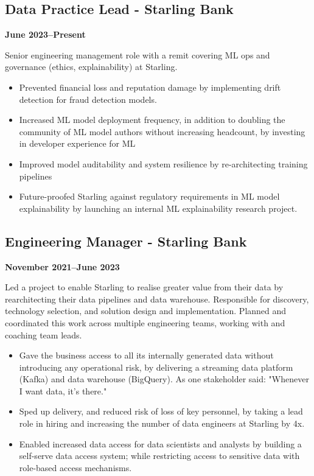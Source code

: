 \documentclass[a4paper]{scrartcl}
\begin{document}
\subsection*{Data Practice Lead - Starling Bank}
\textbf{June 2023--Present}

Senior engineering management role with a remit covering ML ops and governance (ethics,
explainability) at Starling.
\begin{itemize}
	\item Prevented financial loss and reputation damage by implementing
	      drift detection for fraud detection models.
	\item Increased ML model deployment frequency, in addition to doubling the community of ML model authors without increasing headcount, by investing in developer experience for ML
	\item Improved model auditability and system resilience by re-architecting training pipelines
	\item Future-proofed Starling against regulatory requirements in ML model explainability
	      by launching an internal ML explainability research project.
\end{itemize}

\subsection*{Engineering Manager - Starling Bank}
\textbf{November 2021--June 2023}

Led a project to enable Starling to realise greater value from their data by rearchitecting their data pipelines and data warehouse. Responsible for discovery, technology selection, and solution design and implementation. Planned and coordinated this work across multiple engineering teams, working with and coaching team leads.
\begin{itemize}
	\item Gave the business access to all its internally generated data without introducing any operational risk, by delivering a streaming data platform (Kafka) and data warehouse (BigQuery). As one stakeholder said: "Whenever I want data, it's there."
	\item Sped up delivery, and reduced risk of loss of key personnel, by taking a lead role in hiring and increasing the number of data engineers at Starling by 4x.
	\item Enabled increased data access for data scientists and analysts by building a self-serve data access system; while restricting access to sensitive data with role-based access mechanisms.
\end{itemize}
\end{document}
